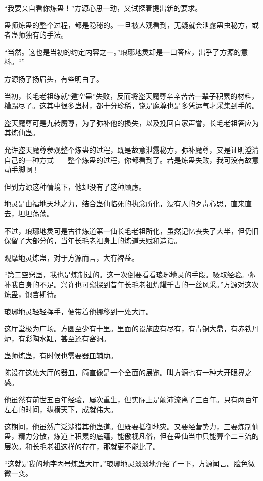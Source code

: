 
\begin{this_body}

“我要亲自看你炼蛊！”方源心思一动，又试探着提出新的要求。

蛊师炼蛊的整个过程，都是隐秘的。一旦被人观看到，无疑就会泄露蛊虫秘方，或者蛊师独有的手法。

“当然。这也是当初的约定内容之一。”琅琊地灵却是一口答应，出乎了方源的意料。“”

方源扬了扬眉头，有些明白了。

当初，长毛老祖练就“遁空蛊”失败，反而将盗天魔尊辛辛苦苦一辈子积累的材料，糟蹋尽了。这其中很多蛊材，都十分珍稀，饶是魔尊也是多凭运气才采集到手的。

盗天魔尊可是九转魔尊，为了弥补他的损失，以及挽回自家声誉，长毛老祖答应为其炼仙蛊。

允许盗天魔尊参观整个炼蛊的过程，既是故意泄露秘方，弥补魔尊，又是证明澄清自己的一种方式——整个炼蛊的过程，你都看到了。若是炼蛊失败，我可没有故意动手脚啊！

但到方源这种情境下，他却没有了这种顾虑。

地灵是由福地天地之力，结合蛊仙临死的执念所化，没有人的歹毒心思，直来直去，坦坦荡荡。

不过，琅琊地灵可是古往炼道第一仙长毛老祖所化，虽然记忆丧失了大半，但仍旧保留了大部分的，当年长毛老祖身上的炼道天赋和造诣。

观摩地灵炼蛊，对于方源而言，大有裨益。

“第二空窍蛊，我也是炼制过的。这一次倒要看看琅琊地灵的手段。吸取经验。弥补我自身的不足。兴许也可窥探到昔年长毛老祖灼耀千古的一丝风采。”方源对这次炼蛊，饱含期待。

琅琊地灵轻轻挥手，便带着他挪移到一处大厅。

这厅堂极为广场。方圆至少有十里。里面的设施应有尽有，有青铜大鼎，有赤铁丹炉，有彩陶水缸，甚至还有窑洞。

蛊师炼蛊，有时候也需要器皿辅助。

陈设在这处大厅的器皿，简直像是一个全面的展览。叫方源也有一种大开眼界之感。

他虽然有前世五百年经验，屡次重生，但实际上是颠沛流离了三百年。只有两百年左右的时间，纵横天下，成就伟大。

这期间，他虽然广泛涉猎其他蛊道。但既要抵御地灾。又要经营势力，三要炼制仙蛊，精力分散，炼道上积累的底蕴，能傲视凡俗，但在蛊仙当中只能算个二三流的层次。和长毛老祖这样的存在，那就更不能比了。

“这就是我的地字丙号炼蛊大厅。”琅琊地灵淡淡地介绍了一下，方源闻言。脸色微微一变。


\end{this_body}
